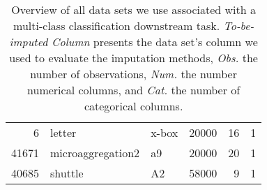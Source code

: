 \begin{table}[h!]
\begin{tabular}{rllrrr}
         6 &                                 letter &     x-box &   20000 &               16 &                1 \\
     41671 &                      microaggregation2 &    a9 &    20000 &               20 &                1 \\
     40685 &                                shuttle &     A2 &   58000 &                9 &                1 \\
\bottomrule
\end{tabular}
\caption{Overview of all data sets we use associated with a multi-class classification downstream task. \emph{To-be-imputed Column} presents the data set's column we used to evaluate the imputation methods, \emph{Obs.} the number of observations, \emph{Num.} the number numerical columns, and \emph{Cat.} the number of categorical columns.}
\label{tab:multiclass_data}
\end{table}

